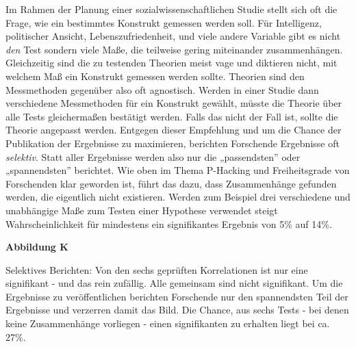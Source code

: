 \documentclass[
  letterpaper,
  DIV=11,
  numbers=noendperiod]{scrreprt}
\begin{document}
Im Rahmen der Planung einer sozialwissenschaftlichen Studie stellt sich
oft die Frage, wie ein bestimmtes Konstrukt gemessen werden soll. Für
Intelligenz, politischer Ansicht, Lebenszufriedenheit, und viele andere
Variable gibt es nicht \emph{den} Test sondern viele Maße, die teilweise
gering miteinander zusammenhängen. Gleichzeitig sind die zu testenden
Theorien meist vage und diktieren nicht, mit welchem Maß ein Konstrukt
gemessen werden sollte. Theorien sind den Messmethoden gegenüber also
oft agnostisch. Werden in einer Studie dann verschiedene Messmethoden
für ein Konstrukt gewählt, müsste die Theorie über alle Tests
gleichermaßen bestätigt werden. Falls das nicht der Fall ist, sollte die
Theorie angepasst werden. Entgegen dieser Empfehlung und um die Chance
der Publikation der Ergebnisse zu maximieren, berichten Forschende
Ergebnisse oft \emph{selektiv}. Statt aller Ergebnisse werden also nur
die „passendsten'' oder „spannendsten'' berichtet. Wie oben im Thema
P-Hacking und Freiheitsgrade von Forschenden klar geworden ist, führt
das dazu, dass Zusammenhänge gefunden werden, die eigentlich nicht
existieren. Werden zum Beispiel drei verschiedene und unabhängige Maße
zum Testen einer Hypothese verwendet steigt Wahrscheinlichkeit für
mindestens ein signifikantes Ergebnis von 5\% auf 14\%.

\textbf{Abbildung K}

Selektives Berichten: Von den sechs geprüften Korrelationen ist nur eine
signifikant - und das rein zufällig. Alle gemeinsam sind nicht
signifikant. Um die Ergebnisse zu veröffentlichen berichten Forschende
nur den spannendsten Teil der Ergebnisse und verzerren damit das Bild.
Die Chance, aus sechs Tests - bei denen keine Zusammenhänge vorliegen -
einen signifikanten zu erhalten liegt bei ca. 27\%.
\end{document}

